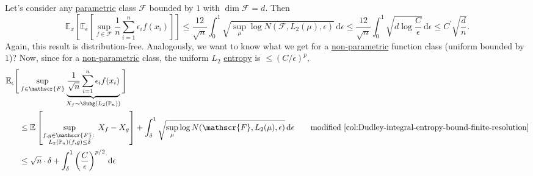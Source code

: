 Let's consider any \hyperref[def:parametric]{parametric} class \(\mathscr{F} \) bounded by \(1\) with \(\dim \mathscr{F} = d\). Then
\[
	\mathbb{E}_{x}\left[\mathbb{E}_{\epsilon }\left[\sup _{f\in \mathscr{F} } \frac{1}{n}\sum_{i=1}^{n} \epsilon _i f(x_i) \right]  \right]
	\leq \frac{12}{\sqrt{n} } \int_{0}^{1} \sqrt{\sup _\mu \log N(\mathscr{F} , L_2(\mu ), \epsilon )} \,\mathrm{d}\epsilon
	\leq \frac{12}{\sqrt{n} } \int_{0}^{1} \sqrt{d \log \frac{C}{\epsilon }} \,\mathrm{d}\epsilon
	\leq C^{\prime} \sqrt{\frac{d}{n}}.
\]
Again, this result is distribution-free. Analogously, we want to know what we get for a \hyperref[def:non-parametric]{non-parametric} function class (uniform bounded by \(1\))? Now, since for a \hyperref[def:non-parametric]{non-parametric} class, the uniform \(L_2\) \hyperref[def:metric-entropy]{entropy} is \(\leq (C / \epsilon )^p\),
\begin{align*}
	\mathbb{E}_{\epsilon }\Bigg[ & \sup _{f\in \mathscr{F} } \underbrace{\frac{1}{\sqrt{n} } \sum_{i=1}^{n} \epsilon _i f(x_i)}_{X_f \sim \Subg(L_2(\mathbb{P} _n))} \Bigg] \\
	                             & \leq \mathbb{E}_{}\left[\sup _{\substack{f, g\in \mathscr{F} \colon                                                                      \\ L_2(\mathbb{P} _n) (f, g) \leq \delta }} X_f - X_g \right] + \int_{\delta }^{1} \sqrt{\sup _\mu \log N(\mathscr{F} , L_2(\mu ), \epsilon )} \,\mathrm{d}\epsilon \tag*{modified \autoref{col:Dudley-integral-entropy-bound-finite-resolution}} \\
	                             & \leq \sqrt{n} \cdot \delta + \int_{\delta }^{1} \left( \frac{C}{\epsilon } \right) ^{p / 2} \,\mathrm{d}\epsilon
\end{align*}
